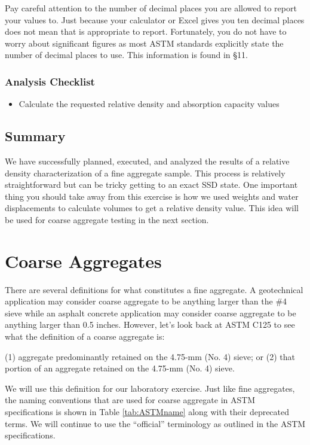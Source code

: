 \documentclass[12pt]{article}
\begin{document}
Pay careful attention to the number of decimal places you are allowed to report your values to. Just because your calculator or Excel gives you ten decimal places does not mean that is appropriate to report. Fortunately, you do not have to worry about significant figures as most ASTM standards explicitly state the number of decimal places to use. This information is found in \S11.

\subsubsection*{Analysis Checklist}
\begin{itemize}
    \item Calculate the requested relative density and absorption capacity values
\end{itemize}

\subsection{Summary}
We have successfully planned, executed, and analyzed the results of a relative density characterization of a fine aggregate sample. This process is relatively straightforward but can be tricky getting to an exact SSD state. One important thing you should take away from this exercise is how we used weights and water displacements to calculate volumes to get a relative density value. This idea will be used for coarse aggregate testing in the next section.

\newpage
\section{Coarse Aggregates}
\label{sec:intro}
\normalsize 
There are several definitions for what constitutes a fine aggregate. A geotechnical application may consider coarse aggregate to be anything larger than the \#4 sieve while an asphalt concrete application may consider coarse aggregate to be anything larger than 0.5 inches. However, let's look back at ASTM C125 to see what the definition of a coarse aggregate is:

\begin{letter}
(1) aggregate predominantly retained on the 4.75-mm (No. 4) sieve; or (2) that portion of an aggregate retained on the 4.75-mm (No. 4) sieve.
\end{letter}

We will use this definition for our laboratory exercise. Just like fine aggregates, the naming conventions that are used for coarse aggregate in ASTM specifications is shown in Table \ref{tab:ASTMname} along with their deprecated terms. We will continue to use the ``official'' terminology as outlined in the ASTM specifications.
\end{document}
